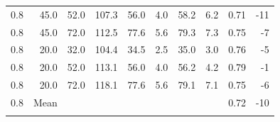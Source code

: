 \begin{table}
\begin{tabular}{rrrrrrrrrr}
0.8 & 45.0 & 52.0 & 107.3 & 56.0 & 4.0 & 58.2 & 6.2 & 0.71 & -11 \\
0.8 & 45.0 & 72.0 & 112.5 & 77.6 & 5.6 & 79.3 & 7.3 & 0.75 & -7 \\
0.8 & 20.0 & 32.0 & 104.4 & 34.5 & 2.5 & 35.0 & 3.0 & 0.76 & -5 \\
0.8 & 20.0 & 52.0 & 113.1 & 56.0 & 4.0 & 56.2 & 4.2 & 0.79 & -1 \\
0.8 & 20.0 & 72.0 & 118.1 & 77.6 & 5.6 & 79.1 & 7.1 & 0.75 & -6 \\
0.8 & Mean & & & & & & & 0.72 & -10 \\
\bottomhline
\end{tabular}
\end{table}
